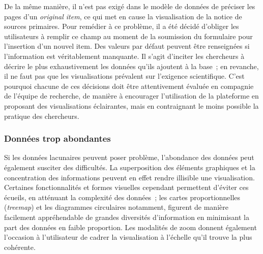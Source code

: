\documentclass[a4paper,12pt,twoside]{book}
\newcommand{\eng}{\emph}
\newcommand{\oi}{\eng{original item}\xspace}
\begin{document}
De la même manière, il n'est pas exigé dans le modèle de données de préciser les pages d'un \oi, ce qui met en cause la visualisation de la notice de sources primaires. Pour remédier à ce problème, il a été décidé d'obliger les utilisateurs à remplir ce champ au moment de la soumission du formulaire pour l'insertion d'un nouvel item. Des valeurs par défaut peuvent être renseignées si l'information est véritablement manquante. Il s'agit d'inciter les chercheurs à décrire le plus exhaustivement les données qu'ils ajoutent à la base~; en revanche, il ne faut pas que les visualisations prévalent sur l'exigence scientifique. C'est pourquoi chacune de ces décisions doit être attentivement évaluée en compagnie de l'équipe de recherche, de manière à encourager l'utilisation de la plateforme en proposant des visualisations éclairantes, mais en contraignant le moins possible la pratique des chercheurs.

			\subsubsection{Données trop abondantes}
Si les données lacunaires peuvent poser problème, l'abondance des données peut également susciter des difficultés. La superposition des éléments graphiques et la concentration des informations peuvent en effet rendre illisible une visualisation. Certaines fonctionnalités et formes visuelles cependant permettent d'éviter ces écueils, en atténuant la complexité des données~; les cartes proportionnelles (\eng{treemap}) et les diagrammes circulaires notamment, figurent de manière facilement appréhendable de grandes diversités d'information en minimisant la part des données en faible proportion. Les modalités de zoom donnent également l'occasion à l'utilisateur de cadrer la visualisation à l'échelle qu'il trouve la plus cohérente.
\end{document}
